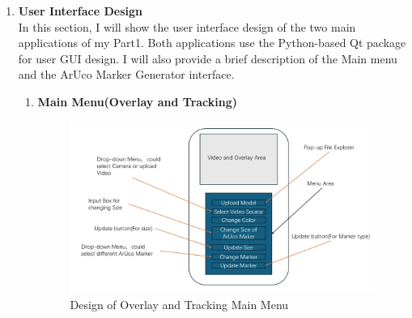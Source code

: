\documentclass[12pt]{article}
\begin{document}
\begin{enumerate}
      \item \textbf{User Interface Design}
            \\
            In this section, I will show the user interface design of the two main applications of my Part1. Both applications use the Python-based Qt package for user GUI design.
            I will also provide a brief description of the Main menu and the ArUco Marker Generator interface.
               \begin{enumerate}
                  \item \textbf{Main Menu(Overlay and Tracking)}
                        \begin{figure}[H]
                              \centering
                              \includegraphics[width=1.2\textwidth]{design_overlay.jpg}
                              \caption{Design of Overlay and Tracking Main Menu}
                        \end{figure}


\end{enumerate}
\end{enumerate}
\end{document}
